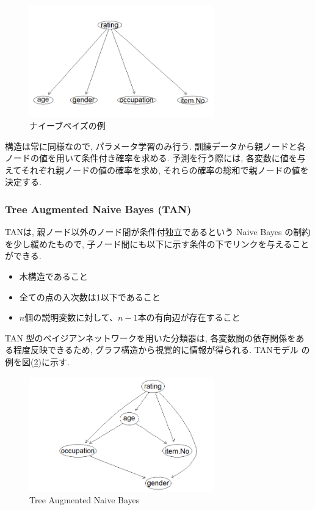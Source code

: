 \documentclass[a4j,12pt]{jarticle}
\begin{document}
\begin{figure}[H]
 \begin{center}
  \includegraphics[width=80mm]{data/sample1.png}
 \end{center}
 \caption{ナイーブベイズの例}
 \label{naive}
\end{figure}

構造は常に同様なので, パラメータ学習のみ行う. 訓練データから親ノードと各ノードの値を用いて条件付き確率を求める. 予測を行う際には, 各変数に値を与えてそれぞれ親ノードの値の確率を求め, それらの確率の総和で親ノードの値を決定する.

\subsubsection{Tree Augmented Naive Bayes (TAN)}

TANは, 親ノード以外のノード間が条件付独立であるという Naive Bayes の制約を少し緩めたもので, 子ノード間にも以下に示す条件の下でリンクを与えることができる.~\cite{Friedman}

\begin{itemize}
\item 木構造であること

\item 全ての点の入次数は1以下であること

\item $n$個の説明変数に対して、$n-1$本の有向辺が存在すること
\end{itemize}

TAN 型のベイジアンネットワークを用いた分類器は, 各変数間の依存関係をある程度反映できるため, グラフ構造から視覚的に情報が得られる. TANモデル の例を図(\ref{TAN})に示す.

\begin{figure}[H]
 \begin{center}
  \includegraphics[width=80mm]{data/sample2.png}
 \end{center}
 \caption{Tree Augmented Naive Bayes}
 \label{TAN}
\end{figure}
\end{document}
